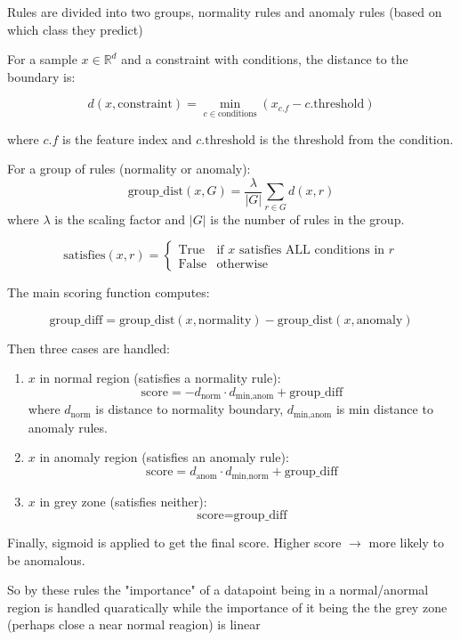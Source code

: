 \documentclass[a4paper,12pt]{article}
\begin{document}
Rules are divided into two groups, normality rules and anomaly rules (based on which class they predict)

For a sample $x \in \mathbb{R}^d$ and a constraint with conditions, the distance to the boundary is:

\[
d(x, \text{constraint}) = \min_{c \in \text{conditions}} \left( x_{c.f} - c.\text{threshold} \right)
\]

where $c.f$ is the feature index and $c.\text{threshold}$ is the threshold from the condition.

For a group of rules (normality or anomaly):
\[
\text{group\_dist}(x, G) = \frac{\lambda}{|G|} \sum_{r \in G} d(x, r)
\]
where $\lambda$ is the scaling factor and $|G|$ is the number of rules in the group.

\[
\text{satisfies}(x, r) = \begin{cases}
\text{True} & \text{if } x \text{ satisfies ALL conditions in } r \\
\text{False} & \text{otherwise}
\end{cases}
\]

The main scoring function computes:

\[
\text{group\_diff} = \text{group\_dist}(x, \text{normality}) - \text{group\_dist}(x, \text{anomaly})
\]

Then three cases are handled:

\begin{enumerate}
    \item $x$ in normal region (satisfies a normality rule):
    \[
    \text{score} = -d_{\text{norm}} \cdot d_{\text{min,anom}} + \text{group\_diff}
    \]
    where $d_{\text{norm}}$ is distance to normality boundary, $d_{\text{min,anom}}$ is min distance to anomaly rules.
    
    \item $x$ in anomaly region (satisfies an anomaly rule):
    \[
    \text{score} = d_{\text{anom}} \cdot d_{\text{min,norm}} + \text{group\_diff}
    \]
    
    \item $x$ in grey zone (satisfies neither):
    \[
    \text{score} = \text{group\_diff}
    \]
\end{enumerate}

Finally, sigmoid is applied to get the final score. Higher score $\rightarrow$ more likely to be anomalous. 

So by these rules the "importance" of a datapoint being in a normal/anormal region is handled quaratically while the importance of it being the the grey zone (perhaps close a near normal reagion) is linear
\end{document}
